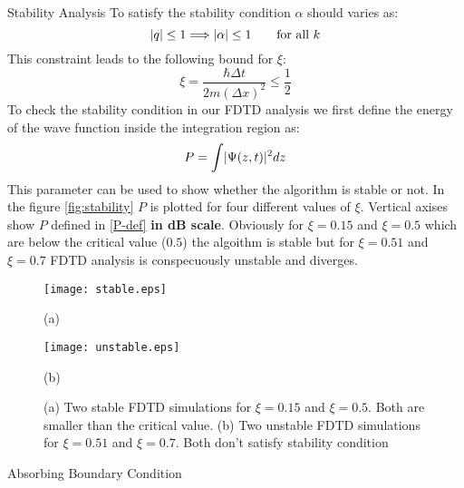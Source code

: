 \begin{homeworkProblem}
\begin{homeworkSection}{Stability Analysis}
To satisfy the stability condition $\alpha$ should varies as:
\begin{equation}
\lvert q\rvert\leq 1\Longrightarrow\lvert\alpha\rvert\leq 1\qquad \text{for all $k$}
\end{equation}
This constraint leads to the following bound for $\xi$:
\begin{equation}
\xi=\frac{\hbar\Delta t}{2m(\Delta x)^2}\leq \frac{1}{2}
\end{equation} 
To check the stability condition in our FDTD analysis we first define the energy of the wave function inside the integration region as:
\begin{equation}\label{P-def}
P=\int\lvert\Psi(z,t)\rvert^2dz
\end{equation} 
This parameter can be used to show whether the algorithm is stable or not. In the figure \eqref{fig:stability} $P$ is plotted for four different values of $\xi$. Vertical axises show $P$ defined in \eqref{P-def} \textbf{in dB scale}. Obviously for $\xi=0.15$ and $\xi=0.5$ which are below the critical value ($0.5$) the algoithm is stable but for $\xi=0.51$ and $\xi=0.7$ FDTD analysis is conspecuously unstable and diverges.

\begin{figure}[t]
\begin{minipage}[b]{1\linewidth}
\centering
\texttt{[image: stable.eps]}
\centerline{\small (a) }
\end{minipage}
\begin{minipage}[b]{1\linewidth}
\centering
\texttt{[image: unstable.eps]}
\centerline{\small (b) }
\end{minipage}
\caption { \small  (a) Two stable FDTD simulations for $\xi=0.15$ and $\xi=0.5$. Both are smaller than the critical value. (b) Two unstable FDTD simulations for $\xi=0.51$ and $\xi=0.7$. Both don't satisfy stability condition} 
\label{fig:stability}
\end{figure}

\end{homeworkSection}

\begin{homeworkSection}{Absorbing Boundary Condition}


\end{homeworkSection}
\end{homeworkProblem}
